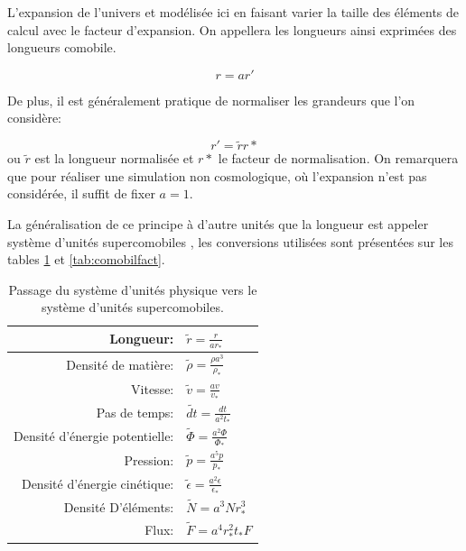 L'expansion de l'univers et modélisée ici en faisant varier la taille des éléments de calcul avec le facteur d'expansion.
On appellera les longueurs ainsi exprimées des longueurs comobile.

\begin{equation}
r=a r'
\end{equation}

De plus, il est généralement pratique de normaliser les grandeurs que l'on considère:

\begin{equation}
r'=\tilde{r}r*
\end{equation}
ou $\tilde{r}$ est la longueur normalisée et $r*$ le facteur de normalisation.
On remarquera que pour réaliser une simulation non cosmologique, où l'expansion n'est pas considérée, il suffit de fixer $a=1$.

La généralisation de ce principe à d'autre unités que la longueur est appeler système d'unités supercomobiles \citep{martel_convenient_1998}, les conversions utilisées sont présentées sur les tables \ref{tab:comobil} et \ref{tab:comobilfact}.

\begin{table}
\begin{center}
\begin{tabular}{r l} \hline 
Longueur: & $\tilde{r}=\frac{r}{ar_*}$ \\ \hline 
Densité de matière: & $\tilde{\rho}=\frac{\rho a^3}{\rho_*}$ \\ \hline 
Vitesse: & $ \tilde{v}=\frac{av}{v_*}$ \\ \hline 
Pas de temps: & $\tilde{dt}=\frac{dt}{a^2t_*}$\\ \hline 
Densité d’énergie potentielle: & $\tilde{\Phi}=\frac{a^2 \Phi}{\Phi_*}$\\ \hline 
Pression: & $\tilde{p}=\frac{a^5 p}{p_*}$\\ \hline 
Densité d’énergie cinétique: & $\tilde{\epsilon}=\frac{a^2 \epsilon}{\epsilon_*}$\\ \hline 
Densité D’éléments: & $\tilde{N}=a^3 N r_*^3$\\ \hline 
Flux: & $\tilde{F}=a^4 r_*^2 t_* F$\\ \hline 
\end{tabular} 
\end{center}
\caption[Système d'unité supercomobile]{Passage du système d'unités physique vers le système d'unités supercomobiles.
\label{tab:comobil}
} 
\end{table}

